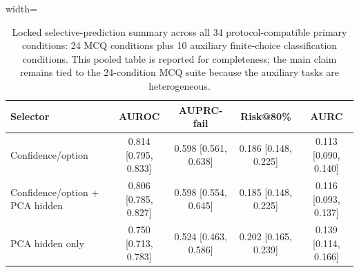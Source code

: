 
\begin{table}[t]
\centering
\small
\caption{Locked selective-prediction summary across all 34 protocol-compatible primary conditions: 24 MCQ conditions plus 10 auxiliary finite-choice classification conditions. This pooled table is reported for completeness; the main claim remains tied to the 24-condition MCQ suite because the auxiliary tasks are heterogeneous.}
\label{tab:all-primary-summary}
\begin{adjustbox}{width=\textwidth}
\begin{tabular}{lcccc}
\toprule
Selector & AUROC & AUPRC-fail & Risk@80\% & AURC \\
\midrule
Confidence/option & 0.814 [0.795, 0.833] & 0.598 [0.561, 0.638] & 0.186 [0.148, 0.225] & 0.113 [0.090, 0.140] \\
Confidence/option + PCA hidden & 0.806 [0.785, 0.827] & 0.598 [0.554, 0.645] & 0.185 [0.148, 0.225] & 0.116 [0.093, 0.137] \\
PCA hidden only & 0.750 [0.713, 0.783] & 0.524 [0.463, 0.586] & 0.202 [0.165, 0.239] & 0.139 [0.114, 0.166] \\
\bottomrule
\end{tabular}
\end{adjustbox}
\end{table}
